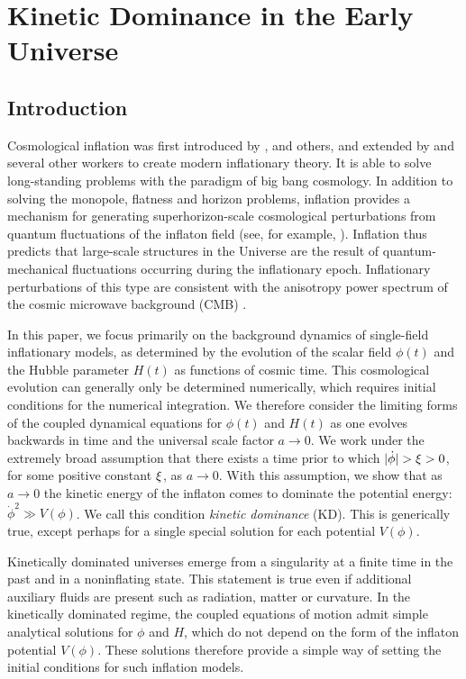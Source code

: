 
\chapter{Kinetic Dominance in the Early Universe}
\label{chap:kd}

\section{Introduction}

Cosmological inflation was first introduced by
\citet{starobinskii_spectrum_1979}, \citet{guth_inflationary_1981} and
others, and extended by \citet{linde_1982} and several other workers
to create modern inflationary theory. It is able to solve
long-standing problems with the paradigm of big bang cosmology. In
addition to solving the monopole, flatness and horizon problems,
inflation provides a mechanism for generating superhorizon-scale
cosmological perturbations from quantum fluctuations of the inflaton
field (see, for example, \citet{mukhanov_theory_1992}). Inflation thus
predicts that large-scale structures in the Universe are the result of
quantum-mechanical fluctuations occurring during the inflationary
epoch. Inflationary perturbations of this type are consistent with the
anisotropy power spectrum of the cosmic microwave background (CMB)
\citep{hinshaw_nine-year_2012,planck_collaboration_planck_2013}.

In this paper, we focus primarily on the background dynamics of single-field inflationary models, as determined by the evolution of the scalar field $\phi(t)$ and the Hubble parameter $H(t)$ as functions of cosmic time.  This cosmological evolution can generally only be determined numerically, which requires initial conditions for the numerical integration.  We therefore consider the limiting forms of the coupled dynamical equations for $\phi(t)$ and $H(t)$ as one evolves backwards in time and the universal scale factor $a\to 0$. We work under the extremely broad assumption that there exists a time prior to which $|\dot{\phi}| > \xi > 0$, for some positive constant $\xi$, as $a \to 0$.  With this assumption, we show that as $a\to 0$ the kinetic energy of the inflaton comes to dominate the potential energy: $\dot{\phi}^2\gg V(\phi)$. We call this condition {\em kinetic dominance} (KD). This is generically true, except perhaps for a single special solution for each potential $V(\phi)$.

Kinetically dominated universes emerge from a singularity at a finite time in the past and in a noninflating state. This statement is true even if additional auxiliary fluids are present such as radiation, matter or curvature.  In the kinetically dominated regime, the coupled equations of motion admit simple analytical solutions for $\phi$ and $H$, which do not depend on the form of the inflaton potential $V(\phi)$.  These solutions therefore provide a simple way of setting the initial conditions for such inflation models.


